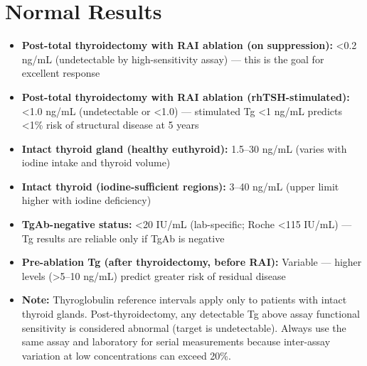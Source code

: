 \section*{Normal Results}
\begin{itemize}
  \item \textbf{Post-total thyroidectomy with RAI ablation (on suppression):} <0.2 ng/mL (undetectable by high-sensitivity assay) --- this is the goal for excellent response
  \item \textbf{Post-total thyroidectomy with RAI ablation (rhTSH-stimulated):} <1.0 ng/mL (undetectable or <1.0) --- stimulated Tg <1 ng/mL predicts <1\% risk of structural disease at 5 years
  \item \textbf{Intact thyroid gland (healthy euthyroid):} 1.5--30 ng/mL (varies with iodine intake and thyroid volume)
  \item \textbf{Intact thyroid (iodine-sufficient regions):} 3--40 ng/mL (upper limit higher with iodine deficiency)
  \item \textbf{TgAb-negative status:} <20 IU/mL (lab-specific; Roche <115 IU/mL) --- Tg results are reliable only if TgAb is negative
  \item \textbf{Pre-ablation Tg (after thyroidectomy, before RAI):} Variable --- higher levels (>5--10 ng/mL) predict greater risk of residual disease
  \item \textbf{Note:} Thyroglobulin reference intervals apply only to patients with intact thyroid glands. Post-thyroidectomy, any detectable Tg above assay functional sensitivity is considered abnormal (target is undetectable). Always use the same assay and laboratory for serial measurements because inter-assay variation at low concentrations can exceed 20\%.
\end{itemize}


